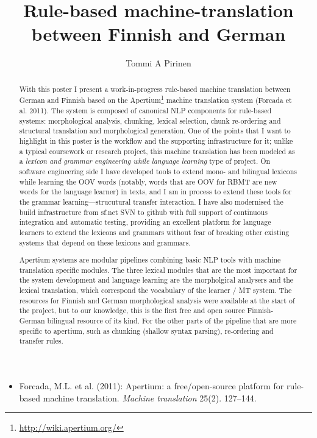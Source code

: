 \documentclass{flammie}
\begin{document}

    \title{Rule-based machine-translation between Finnish and German}

    \author{Tommi A Pirinen}


\maketitle

\begin{abstract}
\noindent With this poster I present a work-in-progress rule-based machine
translation between German and Finnish based on the
Apertium\footnote{\url{http://wiki.apertium.org/}} machine translation
system (Forcada et al. 2011). The system is composed of canonical NLP
components for rule-based systems: morphological analysis, chunking, lexical
selection, chunk re-ordering and structural translation and morphological
generation. One of the points that I want to highlight in this poster is the
workflow and the supporting infrastructure for it; unlike a typical coursework or
research project, this machine translation has been modeled as a \textit{lexicon
and grammar engineering while language learning} type of project. On software
engineering side I have developed tools to extend mono- and bilingual lexicons
while learning the OOV words (notably, words that are OOV for RBMT are new words
for the language learner) in texts, and I am in process to extend these tools
for the grammar learning---strucutural transfer interaction. I have also
modernised the build infrastructure from sf.net SVN to github with full support
of continuous integration and automatic testing, providing an excellent platform
for language learners to extend the lexicons and grammars without fear of
breaking other existing systems that depend on these lexicons and grammars.

Apertium systems are modular pipelines combining basic NLP tools
with machine translation specific modules. The three lexical modules
that are the most important for the system development and language learning are
the morpholgical analysers and the lexical translation, which
correspond the vocabulary of the learner / MT system. The resources for Finnish
and German morphological analysis were available at the start of the project,
but to our knowledge, this is the first free and open source Finnish-German
bilingual resource of its kind. For the other parts of the pipeline that are
more specific to apertium, such as chunking (shallow syntax parsing),
re-ordering and transfer rules.
\end{abstract}

\begin{itemize}
\item    Forcada, M.L. et al. (2011): Apertium: a free/open-source platform for
    rule-based machine translation. \emph{Machine translation} 25(2). 127--144.
\end{itemize}


\end{document}
